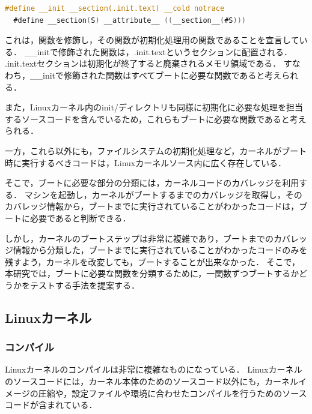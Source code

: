 \documentclass[graduation-thesis]{mlarticle}
\begin{document}
\begin{lstlisting}[language=C, caption=\_\_initマクロの定義, label=code:__init]
  #define __init __section(.init.text) __cold notrace
  #define __section(S) __attribute__ ((__section__(#S)))
\end{lstlisting}

これは，関数を修飾し，その関数が初期化処理用の関数であることを宣言している．
\_\_initで修飾された関数は，.init.textというセクションに配置される．
.init.textセクションは初期化が終了すると廃棄されるメモリ領域である．
すなわち，\_\_initで修飾された関数はすべてブートに必要な関数であると考えられる．

また，Linuxカーネル内のinit/ディレクトリも同様に初期化に必要な処理を担当するソースコードを含んでいるため，これらもブートに必要な関数であると考えられる．

一方，これら以外にも，ファイルシステムの初期化処理など，カーネルがブート時に実行するべきコードは，Linuxカーネルソース内に広く存在している．

そこで，ブートに必要な部分の分類には，カーネルコードのカバレッジを利用する．
マシンを起動し，カーネルがブートするまでのカバレッジを取得し，そのカバレッジ情報から，ブートまでに実行されていることがわかったコードは，ブートに必要であると判断できる．

しかし，カーネルのブートステップは非常に複雑であり，ブートまでのカバレッジ情報から分類した，ブートまでに実行されていることがわかったコードのみを残すよう，カーネルを改変しても，ブートすることが出来なかった．
そこで，本研究では，ブートに必要な関数を分類するために，一関数ずつブートするかどうかをテストする手法を提案する．

\subsection{Linuxカーネル}
\label{propo:linux}

\subsubsection{コンパイル}
\label{propo:linux:compile}
Linuxカーネルのコンパイルは非常に複雑なものになっている．
Linuxカーネルのソースコードには，カーネル本体のためのソースコード以外にも，カーネルイメージの圧縮や，設定ファイルや環境に合わせたコンパイルを行うためのソースコードが含まれている．
\end{document}
